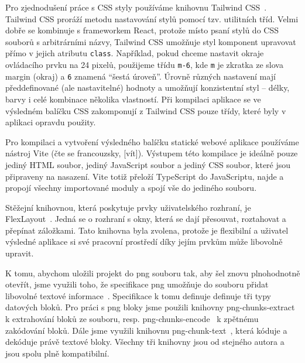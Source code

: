 Pro zjednodušení práce s CSS styly používáme knihovnu Tailwind CSS~\cite{tailwindlabs_tailwindcss_2020}.
Tailwind CSS proráží metodu nastavování stylů pomocí tzv. utilitních tříd.
Velmi dobře se kombinuje s frameworkem React, protože místo psaní stylů do CSS souborů s arbitrárními názvy, Tailwind CSS umožňuje styl komponent upravovat přímo v jejich atributu \texttt{class}.
Například, pokud chceme nastavit okraje ovládacího prvku na 24 pixelů, použijeme třídu \texttt{m-6}, kde \texttt{m} je zkratka ze slova margin (okraj) a \texttt{6} znamená \enquote{šestá úroveň}.
Úrovně různých nastavení mají předdefinované (ale nastavitelné) hodnoty a umožňují konzistentní styl -- délky, barvy i celé kombinace několika vlastností.
Při kompilaci aplikace se ve výsledném balíčku CSS zakomponují z Tailwind CSS pouze třídy, které byly v aplikaci opravdu použity.

Pro kompilaci a vytvoření výsledného balíčku statické webové aplikace používáme nástroj Vite (čte se francouzsky, [vít]).
Výstupem této kompilace je ideálně pouze jediný HTML soubor, jediný JavaScript soubor a jediný CSS soubor, které jsou připraveny na nasazení.
Vite totiž přeloží TypeScript do JavaScriptu, najde a propojí všechny importované moduly a spojí vše do jediného souboru.

Stěžejní knihovnou, která poskytuje prvky uživatelského rozhraní, je FlexLayout~\cite{_flexlayout_2023}.
Jedná se o rozhraní s okny, která se dají přesouvat, roztahovat a přepínat záložkami.
Tato knihovna byla zvolena, protože je flexibilní a uživatel výsledné aplikace si své pracovní prostředí díky jejím prvkům může libovolně upravit.

K tomu, abychom uložili projekt do \acrshort{png} souboru tak, aby šel znovu plnohodnotně otevřít, jsme využili toho, že specifikace \acrshort{png} umožňuje do souboru přidat libovolné textové informace~\cite[sekce 11.3.4]{w3c_portablenetwork_2003}.
Specifikace k tomu definuje definuje tři typy datových bloků.
Pro práci s \acrshort{png} bloky jsme použili knihovny png-chunks-extract~\cite{kennedy_pngchunksextract_2023} k extrahování bloků ze souboru, resp. png-chunks-encode~\cite{kennedy_pngchunksencode_2022} k zpětnému zakódování bloků.
Dále jsme využili knihovnu png-chunk-text~\cite{kennedy_pngchunktext_2022}, která kóduje a dekóduje právě textové bloky.
Všechny tři knihovny jsou od stejného autora a jsou spolu plně kompatibilní.


